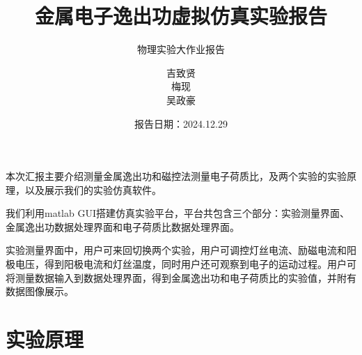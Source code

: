 \documentclass{beamer}
\title{金属电子逸出功虚拟仿真实验报告}
\subtitle{物理实验大作业报告}
\author{吉致贤\\梅现\\吴政豪}
\date{报告日期：2024.12.29}
\begin{document}
    
    \maketitle

    \begin{frame}
    本次汇报主要介绍测量金属逸出功和磁控法测量电子荷质比，及两个实验的实验原理，以及展示我们的实验仿真软件。

    我们利用matlab GUI搭建仿真实验平台，平台共包含三个部分：实验测量界面、金属逸出功数据处理界面和电子荷质比数据处理界面。
    
    实验测量界面中，用户可来回切换两个实验，用户可调控灯丝电流、励磁电流和阳极电压，得到阳极电流和灯丝温度，同时用户还可观察到电子的运动过程。用户可将测量数据输入到数据处理界面，得到金属逸出功和电子荷质比的实验值，并附有数据图像展示。
    \end{frame}

    \section{实验原理}
\end{document}
